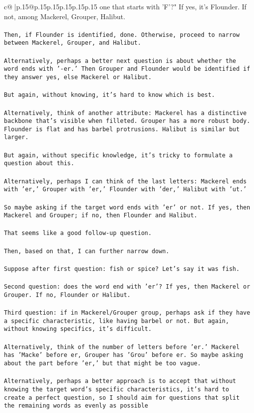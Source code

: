 \documentclass{article}
\begin{document}
{\begin{supertabular}{c@{$\;$}|p{.15\linewidth}@{}p{.15\linewidth}p{.15\linewidth}p{.15\linewidth}p{.15\linewidth}p{.15\linewidth}}
{{{one that starts with 'F'?" If yes, it's Flounder. If not, among Mackerel, Grouper, Halibut.\\ \tt \\ \tt Then, if Flounder is identified, done. Otherwise, proceed to narrow between Mackerel, Grouper, and Halibut.\\ \tt \\ \tt Alternatively, perhaps a better next question is about whether the word ends with '-er.' Then Grouper and Flounder would be identified if they answer yes, else Mackerel or Halibut.\\ \tt \\ \tt But again, without knowing, it's hard to know which is best.\\ \tt \\ \tt Alternatively, think of another attribute: Mackerel has a distinctive backbone that's visible when filleted. Grouper has a more robust body. Flounder is flat and has barbel protrusions. Halibut is similar but larger.\\ \tt \\ \tt But again, without specific knowledge, it's tricky to formulate a question about this.\\ \tt \\ \tt Alternatively, perhaps I can think of the last letters: Mackerel ends with 'er,' Grouper with 'er,' Flounder with 'der,' Halibut with 'ut.'\\ \tt \\ \tt So maybe asking if the target word ends with 'er' or not. If yes, then Mackerel and Grouper; if no, then Flounder and Halibut.\\ \tt \\ \tt That seems like a good follow-up question.\\ \tt \\ \tt Then, based on that, I can further narrow down.\\ \tt \\ \tt Suppose after first question: fish or spice? Let's say it was fish.\\ \tt \\ \tt Second question: does the word end with 'er'? If yes, then Mackerel or Grouper. If no, Flounder or Halibut.\\ \tt \\ \tt Third question: if in Mackerel/Grouper group, perhaps ask if they have a specific characteristic, like having barbel or not. But again, without knowing specifics, it's difficult.\\ \tt \\ \tt Alternatively, think of the number of letters before 'er.' Mackerel has 'Macke' before er, Grouper has 'Grou' before er. So maybe asking about the part before 'er,' but that might be too vague.\\ \tt \\ \tt Alternatively, perhaps a better approach is to accept that without knowing the target word's specific characteristics, it's hard to create a perfect question, so I should aim for questions that split the remaining words as evenly as possible }}}
\end{supertabular}}
\end{document}
